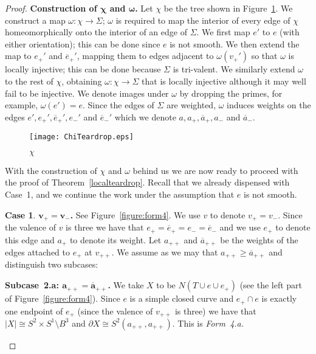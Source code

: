 \documentclass[12pt,reqno]{amsart}
\theoremstyle{plain}
\theoremstyle{definition}
\newtheorem{case}{Case}
\numberwithin{subcase}{case}
\theoremstyle{plain}
\theoremstyle{definition}
\def\scl[#1][#2]{{\scalebox{#1}{#2}}}
\def\oep{\overline{e}_{+}}
\def\oem{\overline{e}_{-}}
\def\ep{e_{+}}
\def\eem{e_{-}}
\def\app{a_{++}}
\def\vpp{v_{++}}
\def\vmm{v_{--}}
\def\oap{\overline{a}_{+}}
\def\oam{\overline{a}_{-}}
\def\oapp{\overline{a}_{++}}
\def\ovpp{\overline{v}_{++}}
\def\ovmm{\overline{v}_{--}}
\def\ap{a_{+}}
\def\am{a_{-}}
\def\vp{v_{+}}
\def\vm{v_{-}}
\def\oapp{\overline{a}_{++}}
\def\ovpp{\overline{v}_{++}}
\def\ovmm{\overline{v}_{--}}
\begin{document}
\begin{proof}
{\bf Construction of \(\boldsymbol{\chi}\) and \(\boldsymbol{\omega}\).} 
Let \(\chi\) be the tree shown in Figure~\ref{notation}. We construct a map \(\omega:\chi \to \Sigma\); \(\omega\) is required to map the interior of every edge of \(\chi\) homeomorphically onto the interior of an edge of \(\Sigma\). We first map \(e'\) to \(e\) (with either orientation); this can be done since \(e\) is not smooth.  We then extend the map to \(\ep'\) and \(\oep'\), mapping them to edges adjacent to \(\omega(\vp')\) so that \(\omega\) is locally injective; this can be done because \(\Sigma\) is tri-valent. We similarly extend \(\omega\) to the rest of \(\chi\), obtaining \(\omega:\chi \to \Sigma\) that is locally injective although it may well fail to be injective.  We denote images under \(\omega\) by dropping the primes, for example, \(\omega(e') = e\).
Since the edges of \(\Sigma\) are weighted, \(\omega\) induces weights on the edges \(e',\ep',\oep',\eem'\) and \(\oem'\) which we denote \(a,\ap,\oap,\am\) and \(\oam\).  
\def\scl{\scalebox{.75}}
\begin{figure}[h!]
\psfrag{1}{{\scl{$\oem'$}}}
\psfrag{2}{\scl{$\vm'$}}
\psfrag{3}{\scl{$\vp'$}}
\psfrag{4}{\scl{$\ovpp'$}}
\psfrag{6}{\scl{$\oep'$}}
\psfrag{7}{\scl{$e'$}}
\psfrag{8}{\scl{$\eem'$}}
\psfrag{9}{\scl{$\ep'$}}
\psfrag{a}{\scl{$\vmm'$}}
\psfrag{b}{\scl{$\vpp'$}}
\psfrag{c}{\scl{$\ovpp'$}}
\psfrag{d}{\scl{$\ovmm'$}}
\centerline{\texttt{[image: ChiTeardrop.eps]}}
\caption{\(\chi\)}
\label{notation}
\end{figure}

\bigskip
\noindent
With the construction of \(\chi\) and \(\omega\) behind us we are now ready to proceed with the proof of Theorem~\ref{localteardrop}.  Recall that we already dispensed with Case~1, and we continue the work under the assumption that \(e\) is not smooth.

\noindent\begin{case}
\textbf{\(\boldsymbol{\vp = \vm}\).} See Figure~\ref{figure:form4}. We use \(v\) to denote \(\vp = \vm\). Since the valence of \(v\) is three we have that \(\ep=\oep = \eem = \oem\) and we use \(\ep\) to denote this edge and \(\ap\) to denote its weight.  Let \(\app\) and \(\oapp\) be the weights of the edges attached to \(\ep\) at \(\vpp\).  We assume as we may that \(\app \geq \oapp\) and distinguish two subcases:

\bigskip\noindent
{\bf Subcase~2.a: \(\boldsymbol{\app = \oapp}\).}  We take \(X\) to be \(N\left(T \cup e \cup \ep  \right)\) (see the left part of Figure~\ref{figure:form4}).  Since \(e\) is a simple closed curve and \(\ep \cap e\) is exactly one endpoint of \(\ep\) (since the valence of \(\vpp\) is three) we have that \(|X| \cong S^{2} \times S^{1} \setminus B^{3}\) and \(\partial X \cong S^{2}(\app,\app)\).  This is \em Form~4.a\em.


\end{case}
\end{proof}
\end{document}
